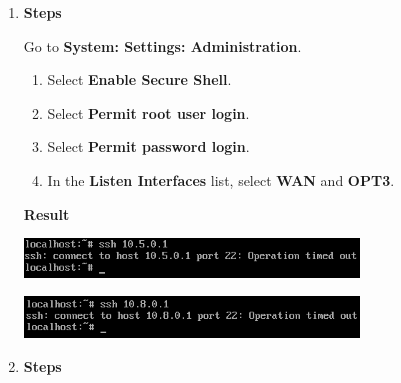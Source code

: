 \documentclass[12pt, a4paper]{article}
\begin{document}
\begin{enumerate}[resume]
    \pagebreak
    \item
    \textbf{Steps}

    Go to \textbf{System: Settings: Administration}.
    \begin{enumerate}
      \item Select \textbf{Enable Secure Shell}.
      \item Select \textbf{Permit root user login}.
      \item Select \textbf{Permit password login}.
      \item In the \textbf{Listen Interfaces} list, select \textbf{WAN} and \textbf{OPT3}.
    \end{enumerate}

    \textbf{Result}

    \includegraphics[width=0.7\textwidth]{7_ssh_vlan5.png}

    \includegraphics[width=0.7\textwidth]{7_ssh_vlan8.png}
%

    \item
    \textbf{Steps}


\end{enumerate}
\end{document}
